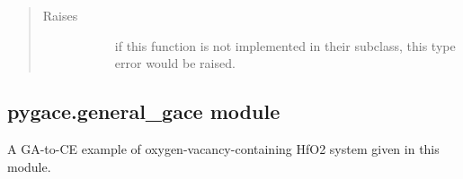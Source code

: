 \documentclass[letterpaper,10pt,english]{sphinxmanual}
\begin{document}
\begin{fulllineitems}
\begin{fulllineitems}
\begin{quote}
\begin{description}
\item[{Raises}] \leavevmode\begin{description}
\item[{}] \leavevmode
if this function is not implemented in their subclass, this type
error would be raised.

\end{description}

\end{description}\end{quote}

\end{fulllineitems}


\end{fulllineitems}



\subsection{pygace.general\_gace module}
\label{\detokenize{pygace:pygace-general-gace-module}}\label{\detokenize{pygace:module-pygace.general_gace}}
A GA-to-CE example of oxygen-vacancy-containing HfO2 system given in
this module.
\end{document}
